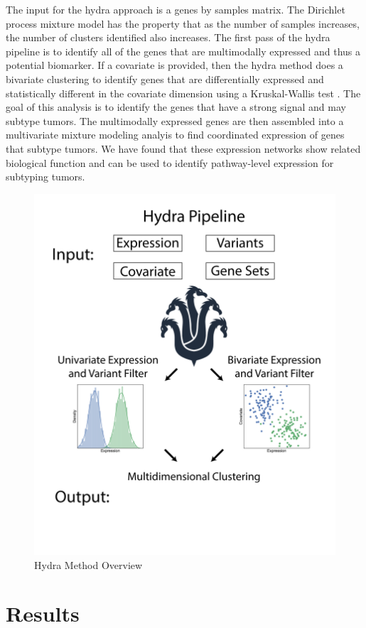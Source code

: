 \documentclass[fleqn,10pt]{wlscirep}
\begin{document}
The input for the hydra approach is a genes by samples matrix. The Dirichlet process mixture model has the property that as the number of samples increases, the number of clusters identified also increases. The first pass of the hydra pipeline is to identify all of the genes that are multimodally expressed and thus a potential biomarker. If a covariate is provided, then the hydra method does a bivariate clustering to identify genes that are differentially expressed and statistically different in the covariate dimension using a Kruskal-Wallis test \cite{mckight2010kruskal}. The goal of this analysis is to identify the genes that have a strong signal and may subtype tumors. The multimodally expressed genes are then assembled into a multivariate mixture modeling analyis to find coordinated expression of genes that subtype tumors. We have found that these expression networks show related biological function and can be used to identify pathway-level expression for subtyping tumors.

\begin{figure}
	\centering
	\includegraphics[width=0.5\linewidth]{images/hydra-overview@2x.png}
	\caption{Hydra Method Overview}
	\label{sfig:hydra-overview}
\end{figure}

\section*{Results}
\end{document}
